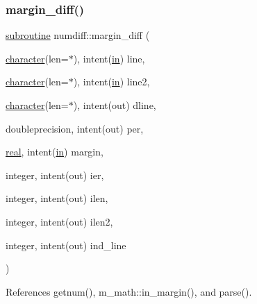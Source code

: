 \subsubsection{\texorpdfstring{margin\+\_\+diff()}{margin\_diff()}}
{\footnotesize\ttfamily \hyperlink{M__stopwatch_83_8txt_acfbcff50169d691ff02d4a123ed70482}{subroutine} numdiff\+::margin\+\_\+diff (\begin{DoxyParamCaption}\item[{\hyperlink{option__stopwatch_83_8txt_abd4b21fbbd175834027b5224bfe97e66}{character}(len=$\ast$), intent(\hyperlink{M__journal_83_8txt_afce72651d1eed785a2132bee863b2f38}{in})}]{line,  }\item[{\hyperlink{option__stopwatch_83_8txt_abd4b21fbbd175834027b5224bfe97e66}{character}(len=$\ast$), intent(\hyperlink{M__journal_83_8txt_afce72651d1eed785a2132bee863b2f38}{in})}]{line2,  }\item[{\hyperlink{option__stopwatch_83_8txt_abd4b21fbbd175834027b5224bfe97e66}{character}(len=$\ast$), intent(out)}]{dline,  }\item[{doubleprecision, intent(out)}]{per,  }\item[{\hyperlink{read__watch_83_8txt_abdb62bde002f38ef75f810d3a905a823}{real}, intent(\hyperlink{M__journal_83_8txt_afce72651d1eed785a2132bee863b2f38}{in})}]{margin,  }\item[{integer, intent(out)}]{ier,  }\item[{integer, intent(out)}]{ilen,  }\item[{integer, intent(out)}]{ilen2,  }\item[{integer, intent(out)}]{ind\+\_\+line }\end{DoxyParamCaption})}



References getnum(), m\+\_\+math\+::in\+\_\+margin(), and parse().

